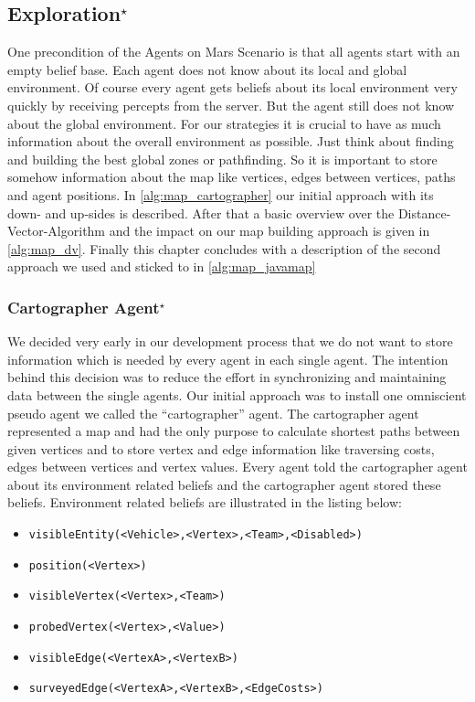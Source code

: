\subsection[Exploration]{Exploration$^\star$}\label{alg:exploration}
One precondition of the Agents on Mars Scenario is that all agents start with an empty belief base. Each agent does not know about its local and global environment. Of course every agent gets beliefs about its local environment very quickly by receiving percepts from the server. But the agent still does not know about the global environment. For our strategies it is crucial to have as much information about the overall environment as possible. Just think about finding and building the best global zones or pathfinding. So it is important to store somehow information about the map like vertices, edges between vertices, paths and agent positions. In \autoref{alg:map_cartographer} our initial approach with its down- and up-sides is described. After that a basic overview over the Distance-Vector-Algorithm and the impact on our map building approach is given in \autoref{alg:map_dv}. Finally this chapter concludes with a description of the second approach we used and sticked to in \autoref{alg:map_javamap}


\subsubsection[Cartographer Agent]{Cartographer Agent$^\star$}\label{alg:map_cartographer}
We decided very early in our development process that we do not want to store information which is needed by every agent in each single agent. The intention behind this decision was to reduce the effort in synchronizing and maintaining data between the single agents. Our initial approach was to install one omniscient pseudo agent we called the ``cartographer'' agent. The cartographer agent represented a map and had the only purpose to calculate shortest paths between given vertices and to store vertex and edge information like traversing costs, edges between vertices and vertex values. Every agent told the cartographer agent about its environment related beliefs and the cartographer agent stored these beliefs. Environment related beliefs are illustrated in the listing below:

\begin{itemize}
  \item \texttt{visibleEntity(<Vehicle>,<Vertex>,<Team>,<Disabled>)}
  \item \texttt{position(<Vertex>)}
  \item \texttt{visibleVertex(<Vertex>,<Team>)}
  \item \texttt{probedVertex(<Vertex>,<Value>)}
  \item \texttt{visibleEdge(<VertexA>,<VertexB>)}
  \item \texttt{surveyedEdge(<VertexA>,<VertexB>,<EdgeCosts>)}
\end{itemize}

